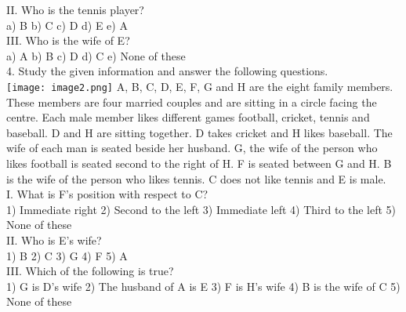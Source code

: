 \documentclass[
]{article}
\begin{document}
II. Who is the tennis player?\\
a) B \hspace{2mm}b) C \hspace{2mm}c) D \hspace{2mm}d) E \hspace{2mm}e) A\\

III. Who is the wife of E?\\
a) A \hspace{2mm}b) B \hspace{2mm}c) D \hspace{2mm}d) C \hspace{2mm}e) None of these\\

4. Study the given information and answer the following questions.\\
\texttt{[image: image2.png]}
A, B, C, D, E, F, G and H are the eight family members. These members are four married
couples and are sitting in a circle facing the centre. Each male member likes different games
football, cricket, tennis and baseball. D and H are sitting together. D takes cricket and H
likes baseball. The wife of each man is seated beside her husband. G, the wife of the person
who likes football is seated second to the right of H. F is seated between G and H. B is the
wife of the person who likes tennis. C does not like tennis and E is male.\\

I. What is F’s position with respect to C?\\
1) Immediate right \hspace{2mm}2) Second to the left \hspace{2mm}3) Immediate left
\hspace{2mm}4) Third to the left \hspace{2mm}5) None of these\\

II. Who is E's wife?\\
1) B \hspace{2mm}2) C \hspace{2mm}3) G \hspace{2mm}4) F \hspace{2mm}5) A\\

III. Which of the following is true?\\
1) G is D's wife \hspace{2mm}2) The husband of A is E \hspace{2mm}3) F is H's wife
\hspace{2mm}4) B is the wife of C \hspace{2mm}5) None of these\\
\end{document}
